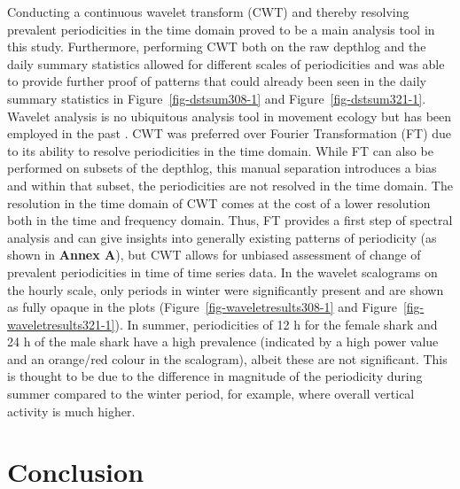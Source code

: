 \documentclass[
  authoryear,
  review,
  3p]{elsarticle}
\begin{document}
Conducting a continuous wavelet transform (CWT) and thereby resolving
prevalent periodicities in the time domain proved to be a main analysis
tool in this study. Furthermore, performing CWT both on the raw depthlog
and the daily summary statistics allowed for different scales of
periodicities and was able to provide further proof of patterns that
could already been seen in the daily summary statistics in
Figure~\ref{fig-dstsum308-1} and Figure~\ref{fig-dstsum321-1}. Wavelet
analysis is no ubiquitous analysis tool in movement ecology but has been
employed in the past \citep{wittemyer_2008, zhang_2020}. CWT was
preferred over Fourier Transformation (FT) due to its ability to resolve
periodicities in the time domain. While FT can also be performed on
subsets of the depthlog, this manual separation introduces a bias and
within that subset, the periodicities are not resolved in the time
domain. The resolution in the time domain of CWT comes at the cost of a
lower resolution both in the time and frequency domain. Thus, FT
provides a first step of spectral analysis and can give insights into
generally existing patterns of periodicity (as shown in \textbf{Annex
A}), but CWT allows for unbiased assessment of change of prevalent
periodicities in time of time series data. In the wavelet scalograms on
the hourly scale, only periods in winter were significantly present and
are shown as fully opaque in the plots
(Figure~\ref{fig-waveletresults308-1} and
Figure~\ref{fig-waveletresults321-1}). In summer, periodicities of 12 h
for the female shark and 24 h of the male shark have a high prevalence
(indicated by a high power value and an orange/red colour in the
scalogram), albeit these are not significant. This is thought to be due
to the difference in magnitude of the periodicity during summer compared
to the winter period, for example, where overall vertical activity is
much higher.

\hypertarget{conclusion}{%
\section{Conclusion}\label{conclusion}}
\end{document}
